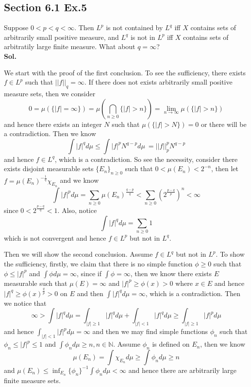 \documentclass[lang=en,11pt,a4paper,citestyle =authoryear]{elegantpaper}
\newcommand{\N}{\mathbb{N}}
\begin{document}
\subsection*{Section 6.1 Ex.5} 
Suppose $0<p<q<\infty$. Then $L^p$ is not contained by $L^q$ iff $X$ contains sets of arbitrarily small positive measure, and $L^q$ is not in $L^p$ iff $X$ contains sets of arbitratily large finite measure. What about $q = \infty$?
\vspace{0.5em}\\
\textbf{Sol.} \par
We start with the proof of the first conclusion. To see the sufficiency, there exists $f\in L^p$ such that $||f||_q = \infty$. If there does not exists arbitrarily small positive measure sets, then we consider
\[ 0= \mu(\{|f|=\infty\}) = \mu(\bigcap_{n\geq 0} \{|f|>n\}) = \lim_{n\to\infty} \mu(\{|f|>n\})\]
and hence there exists an integer $N$ such that $\mu(\{|f|>N\}) = 0$ or there will be a contradiction. Then we know
\[\int |f|^q d\mu \leq \int |f|^pN^{q-p}d\mu\ = ||f||_p^pN^{q-p}\]
and hence $f\in L^q$, which is a contradiction. So see the necessity, consider there exists disjoint measurable sets $\{E_n\}_{n\geq 0}$ such that $ 0< \mu(E_n) < 2^{-n}$, then let $f= \mu(E_n)^{-\tfrac{1}{q}}\chi_{E_n}$ and we know
\[\int |f|^p d\mu = \sum\limits_{n\geq 0}\mu(E_n)^{\tfrac{q-p}{q}} < \sum\limits_{n\geq 0}(2^{\tfrac{p-q}{p}})^n < \infty\]
since $0 < 2^{\tfrac{p-q}{q}} < 1$. Also, notice
\[\int |f|^q d\mu = \sum\limits_{n\geq 0}1\]
which is not convergent and hence $f\in L^p$ but not in $L^q$.\par
Then we will show the second conclusion. Assume $f\in L^q$ but not in $L^p$. To show the sufficiency, firstly, we claim that there is no simple function $\phi\geq 0$ such that $\phi\leq |f|^p$ and $\int \phi d\mu= \infty$, since if $\int\phi = \infty$, then we know there exists $E$ measurable such that $\mu(E) = \infty$ and $|f|^p \geq \phi(x) > 0$ where $x\in E$ and hence $|f|^q \geq \phi(x)^{\tfrac{q}{p}} > 0$ on $E$ and then $\int |f|^q d\mu = \infty$, which is a contradiction. Then we notice that
\[\infty > \int |f|^q d\mu = \int_{|f|\geq 1} |f|^q d\mu + \int_{|f|<1} |f|^q d\mu \geq \int_{|f|\geq 1} |f|^p d\mu\]
and hence $\int_{|f|<1} |f|^p d\mu = \infty$ and then we may find simple functions $\phi_n$ such that $\phi_n \leq |f|^p \leq 1$ and $\int \phi_n d\mu \geq n, n\in \N$. Assume $\phi_n$ is defined on $E_n$, then we know
\[\mu(E_n) = \int \chi_{E_n} d\mu \geq \int \phi_n d\mu \geq n\]
and $\mu(E_n) \leq \inf_{E_n}\{\phi_n\}^{-1}\int \phi_n d\mu <\infty$ and hence there are arbitrarily large finite measure sets.\par
\end{document}
